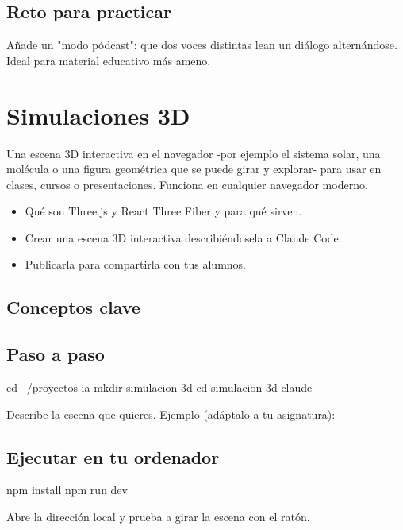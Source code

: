 \documentclass[11pt,a4paper]{book}
\begin{document}
\section{Reto para practicar}
Añade un "modo pódcast": que dos voces distintas lean un diálogo alternándose. Ideal para material educativo más ameno.

\chapter{Simulaciones 3D}
Una escena 3D interactiva en el navegador -por ejemplo el sistema solar, una molécula o una figura geométrica que se puede girar y explorar- para usar en clases, cursos o presentaciones. Funciona en cualquier navegador moderno.

\begin{itemize}\item Qué son Three.js y React Three Fiber y para qué sirven.\end{itemize}
\begin{itemize}\item Crear una escena 3D interactiva describiéndosela a Claude Code.\end{itemize}
\begin{itemize}\item Publicarla para compartirla con tus alumnos.\end{itemize}
\section{Conceptos clave}
\section{Paso a paso}
\begin{codebox}
cd ~/proyectos-ia
mkdir simulacion-3d
cd simulacion-3d
claude
\end{codebox}
Describe la escena que quieres. Ejemplo (adáptalo a tu asignatura):

\section{Ejecutar en tu ordenador}
\begin{codebox}
npm install
npm run dev
\end{codebox}
Abre la dirección local y prueba a girar la escena con el ratón.
\end{document}
